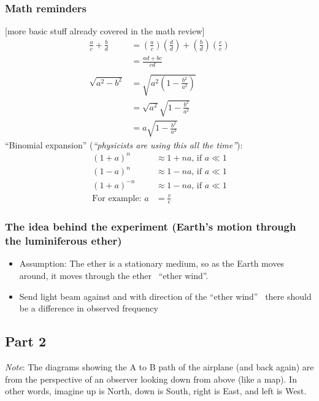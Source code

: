 \documentclass[pagesize,headsepline,10pt,parskip=half]{scrreprt}
\newcommand{\const}[1]{\ensuremath{\mathrm{#1}}}
\renewcommand{\c}{\const{c}}
\begin{document}
        \subsubsection{Math reminders}
          [more basic stuff already covered in the math review]
          \begin{align*}
            \frac{a}{c} + \frac{b}{d} &= \left(\frac{a}{c}\right)\left(\frac{d}{d}\right) + \left(\frac{b}{d}\right)\left(\frac{c}{c}\right) \\
            &= \frac{ad + bc}{cd}\\
            \\
            \sqrt{a^2 - b^2} &= \sqrt{a^2 \left(1 - \frac{b^2}{a^2}\right)} \\
            &= \sqrt{a^2} \sqrt{1 - \frac{b^2}{a^2}}\\
            &= a \sqrt{1 - \frac{b^2}{a^2}}
          \end{align*}
          “Binomial expansion” (\emph{“physicists are using this all the time”}):\label{eq:binomial-expansion}
          \begin{align*}
            {\left(1 + a\right)}^n &\approx 1 + na\text{, if } a \ll 1\\
            {\left(1 - a\right)}^n &\approx 1 - na\text{, if } a \ll 1\\
            {\left(1 + a\right)}^{-n} &\approx 1 - na\text{, if } a \ll 1\\
            \text{For example: }a &= \frac{v}{\c}
          \end{align*}
        \subsubsection{The idea behind the experiment (Earth’s motion through the luminiferous ether)}
          \begin{itemize}
            \item Assumption: The ether is a stationary medium, so as the Earth moves around, it moves through the ether
              \rightarrow~“ether wind”.
            \item Send light beam against and with direction of the “ether wind”
              \rightarrow~there should be a difference in observed frequency
          \end{itemize}

      \subsection{Part 2}
        \emph{Note}: The diagrams showing the A to B path of the airplane (and back again) are from the perspective of
        an observer looking down from above (like a map). In other words, imagine up is North, down is South,
        right is East, and left is West.
\end{document}
